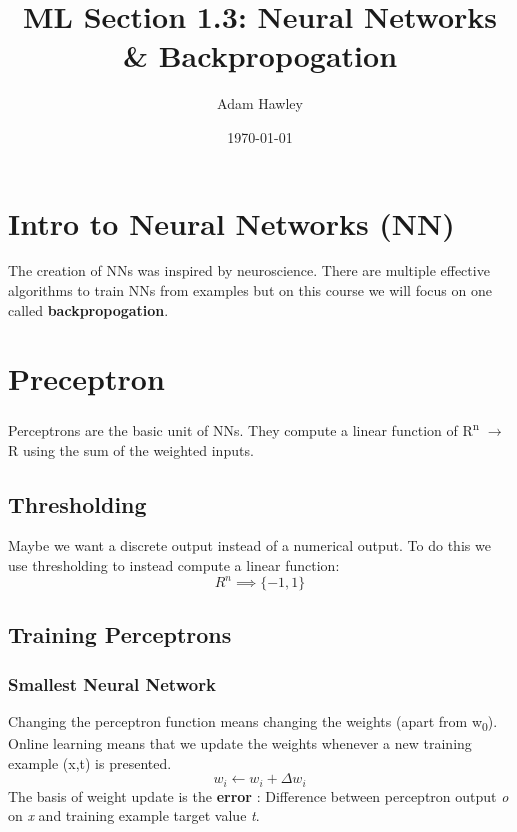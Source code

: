 \documentclass[11pt]{article}
\author{Adam Hawley}
\date{\today}
\title{ML Section 1.3: Neural Networks \& Backpropogation}
\begin{document}
\maketitle
\tableofcontents


\section{Intro to Neural Networks (NN)}
\label{sec:orgaf26771}
The creation of NNs was inspired by neuroscience.
There are multiple effective algorithms to train NNs from examples but on this course we will focus on one called \textbf{backpropogation}.

\section{Preceptron}
\label{sec:org9166f48}
Perceptrons are the basic unit of NNs.
They compute a linear function of R\textsuperscript{n} \(\rightarrow\) R using the sum of the weighted inputs.

\subsection{Thresholding}
\label{sec:orgfa04ae1}
Maybe we want a discrete output instead of a numerical output.
To do this we use thresholding to instead compute a linear function: 
\begin{equation}
R^n \implies \{-1,1\}
\end{equation}

\subsection{Training Perceptrons}
\label{sec:org2f2838d}
\subsubsection{Smallest Neural Network}
\label{sec:orgba7a92b}
Changing the perceptron function means changing the weights (apart from w\textsubscript{0}).
Online learning means that we update the weights whenever a new training example (x,t) is presented.
\begin{equation}
w_i \leftarrow w_i +{\Delta}w_i
\end{equation}
The basis of weight update is the \textbf{error} : Difference between perceptron output \emph{o} on \emph{x} and training example target value \emph{t}.
\end{document}
